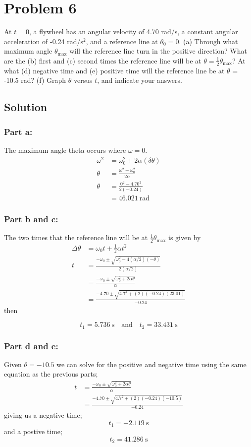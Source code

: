 \documentclass{article}
\begin{document}
\section*{Problem 6}
At $t = 0$, a flywheel has an angular velocity of 4.70 rad/s, a constant angular acceleration of
-0.24 rad/s$^2$, and a reference line at $\theta_0 = 0$. (a) Through what maximum angle $\theta_{\text{max}}$ will the
reference line turn in the positive direction? What are the (b) first and (c) second times the
reference line will be at $\theta = \frac{1}{2}\theta_\text{max}$? At what (d) negative time and (e) positive time will the
reference line be at $\theta$ = -10.5 rad? (f) Graph $\theta$ versus $t$, and indicate your answers.

\subsection*{Solution}
\subsubsection*{Part a:}
The maximum angle theta occurs where $\omega = 0$.
\begin{align*}
	\omega^2 &= \omega_0^2 + 2\alpha(\delta \theta) \\
	\theta &= \frac{\omega^2 - \omega_0^2}{2 \alpha} \\
	\theta &= \frac{0^2 - 4.70^2}{2(-0.24)} \\
	       &= \boxed{46.021\ \text{rad}}
\end{align*}
\subsubsection*{Part b and c:}
The two times that the reference line will be at $\frac{1}{2}\theta_\text{max}$ is given by
\begin{align*}
	\Delta \theta &= \omega_0 t + \frac{1}{2}\alpha t^2 \\
	t &= \frac{-\omega_0 \pm \sqrt{\omega_0^2 - 4(\alpha/2)(-\theta)}}{2(\alpha/2)} \\
	  &= \frac{-\omega_0 \pm \sqrt{\omega_0^2 + 2 \alpha \theta}}{\alpha} \\
	  &= \frac{-4.70 \pm \sqrt{4.7^2 + (2)(-0.24)(23.01)}}{-0.24}
\end{align*}
then

\[
	\boxed{t_1 = 5.736\ \text{s} \quad \text{and} \quad t_2 = 33.431\ \text{s}}
\]

\subsubsection*{Part d and e:}
Given $\theta = -10.5$ we can solve for the positive and negative time using the same equation as the previous parts;
\begin{align*}
	t &= \frac{-\omega_0 \pm \sqrt{\omega_0^2 + 2 \alpha \theta}}{\alpha} \\
	  &= \frac{-4.70 \pm \sqrt{4.7^2 + (2)(-0.24)(-10.5)}}{-0.24}
\end{align*}
giving us a negative time;
\[
	\boxed{t_1 = -2.119\ \text{s}}
\]
and a postive time;
\[
	\boxed{t_2 = 41.286\ \text{s}}
\]
\end{document}
